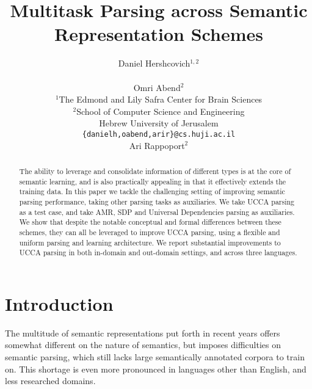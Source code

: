 \documentclass[11pt,a4paper]{article}
\title{Multitask Parsing across Semantic Representation Schemes}
\author{Daniel Hershcovich$^{1,2}$ \\
  \\\And
  Omri Abend$^2$ \\
  $^1$The Edmond and Lily Safra Center for Brain Sciences \\
  $^2$School of Computer Science and Engineering \\
  Hebrew University of Jerusalem \\
  \texttt{\{danielh,oabend,arir\}@cs.huji.ac.il}
  \\\And
  Ari Rappoport$^2$
}
\date{}
\begin{document}
\maketitle

\begin{abstract}
		The ability to leverage and consolidate information of different types
		is at the core of semantic learning, and is also practically appealing
		in that it effectively extends the training data. In this paper we
		tackle the challenging setting of improving semantic parsing
		performance, taking other parsing tasks as auxiliaries. We take UCCA
		parsing as a test case, and take AMR, SDP and Universal Dependencies
		parsing as auxiliaries. We show that despite the notable conceptual
		and formal differences between these schemes, they can all be
		leveraged to improve UCCA parsing, using a flexible and uniform
		parsing and learning architecture. We report substantial improvements
		to UCCA parsing in both in-domain and out-domain settings, and across
		three languages.
\end{abstract}

\section{Introduction}\label{sec:introduction}

The multitude of semantic representations put forth in recent years offers
somewhat different on the nature of semantics,
but imposes difficulties on semantic parsing, which still lacks large semantically annotated
corpora to train on. This shortage is even more pronounced in languages other than English, and
less researched domains. 

\end{document}
